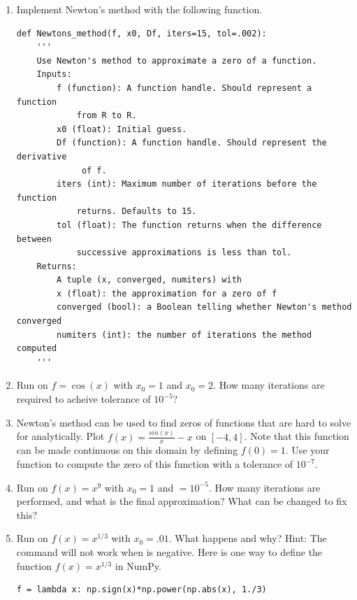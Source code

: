 \begin{problem}
\label{prob:newton_arr}
\leavevmode
\begin{enumerate}
\item Implement Newton's method with the following function.
\begin{lstlisting}
def Newtons_method(f, x0, Df, iters=15, tol=.002):
    '''
    Use Newton's method to approximate a zero of a function.
    Inputs:
        f (function): A function handle. Should represent a function 
            from R to R.
        x0 (float): Initial guess.
        Df (function): A function handle. Should represent the derivative
             of f.
        iters (int): Maximum number of iterations before the function
            returns. Defaults to 15.
        tol (float): The function returns when the difference between
            successive approximations is less than tol.
    Returns:
        A tuple (x, converged, numiters) with
        x (float): the approximation for a zero of f
        converged (bool): a Boolean telling whether Newton's method converged
        numiters (int): the number of iterations the method computed
    '''
\end{lstlisting}

\item Run  on $f=\cos(x)$ with $x_0=1$ and $x_0=2$. 
How many iterations are required to acheive tolerance of $10^{-5}$?
\item Newton's method can be used to find zeros of functions that are hard to solve for analytically.
Plot $f(x) = \frac{sin(x)}{x}-x$ on $[-4, 4]$. 
Note that this function can be made continuous on this domain by defining $f(0)=1$. 
Use your function  to compute the zero of this function with a tolerance of $10^{-7}$.
\item Run  on $f(x)=x^9$ with $x_0=1$ and $=10^{-5}$. 
How many iterations are performed, and what is the final approximation? 
What can be changed to fix this?
\item Run  on $f(x)=x^{1/3}$ with $x_0=.01$. 
What happens and why?
Hint: The command  will not work when  is negative. 
Here is one way to define the function $f(x)=x^{1/3}$ in NumPy.
\begin{lstlisting}
f = lambda x: np.sign(x)*np.power(np.abs(x), 1./3)
\end{lstlisting}
\end{enumerate}
\end{problem}

